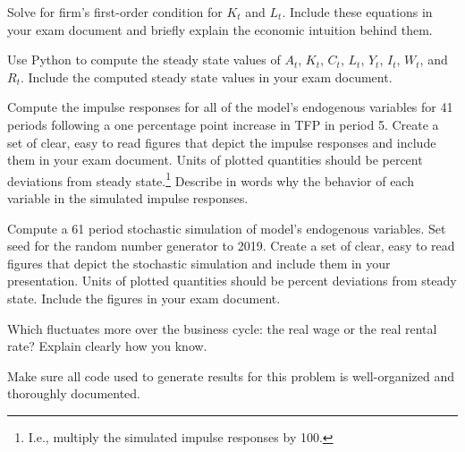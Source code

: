 Solve for firm's first-order condition for $K_t$ and $L_t$.  Include these equations in your exam document and briefly explain the economic intuition behind them.

 Use Python to compute the steady state values of $A_t$, $K_t$, $C_t$, $L_t$, $Y_t$, $I_t$, $W_t$, and $R_t$. Include the computed steady state values in your exam document.

 Compute the impulse responses for all of the model's endogenous variables for 41 periods following a one percentage point increase in TFP in period 5. Create a set of clear, easy to read figures that depict the impulse responses and include them in your exam document. Units of plotted quantities should be percent deviations from steady state.\footnote{I.e., multiply the simulated impulse responses by 100.} Describe in words why the behavior of each variable in the simulated impulse responses.

 Compute a 61 period stochastic simulation of model's endogenous variables. Set seed for the random number generator to 2019. Create a set of clear, easy to read figures that depict the stochastic simulation and include them in your presentation. Units of plotted quantities should be percent deviations from steady state. Include the figures in your exam document.

 Which fluctuates more over the business cycle: the real wage or the real rental rate? Explain clearly how you know.

 Make sure all code used to generate results for this problem is well-organized and thoroughly documented.

\NE